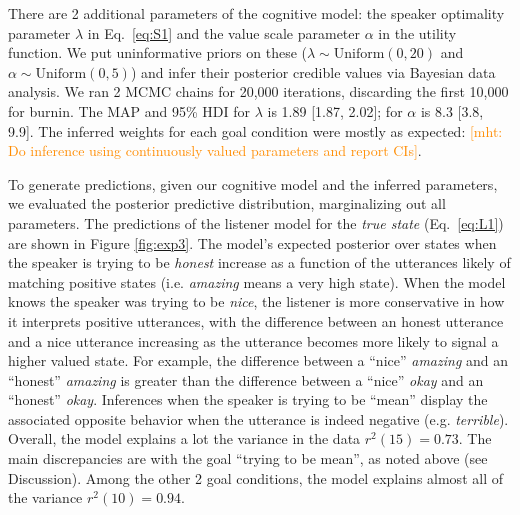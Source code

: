 \documentclass[10pt,letterpaper]{article}
\newcommand{\red}[1]{\textcolor{Red}{#1}}
\newcommand{\ndg}[1]{\textcolor{Green}{[ndg: #1]}}
\newcommand{\mht}[1]{\textcolor{DarkOrange}{[mht: #1]}}
\begin{document}
There are 2 additional parameters of the cognitive model: the speaker optimality parameter $\lambda$ in Eq.~\ref{eq:S1} and the value scale parameter $\alpha$ in the utility function. 
We put uninformative priors on these ($\lambda \sim \text{Uniform}(0,20)$ and $\alpha \sim \text{Uniform}(0, 5)$) and infer their posterior credible values via Bayesian data analysis.
We ran 2 MCMC chains for 20,000 iterations, discarding the first 10,000 for burnin.
The MAP and 95\% HDI for $\lambda$ is 1.89 [1.87, 2.02]; for $\alpha$ is 8.3 [3.8, 9.9]. %
The inferred weights for each goal condition were mostly as expected: 
\mht{Do inference using continuously valued parameters and report CIs}.
%

To generate predictions, given our cognitive model and the inferred parameters, we evaluated the posterior predictive distribution, marginalizing out all parameters. 
The predictions of the listener model for the \emph{true state} (Eq.~\ref{eq:L1}) are shown in Figure \ref{fig:exp3}.
The model's expected posterior over states when the speaker is trying to be \emph{honest} increase as a function of the utterances likely of matching positive states (i.e. \emph{amazing} means a very high state).
When the model knows the speaker was trying to be \emph{nice}, the listener is more conservative in how it interprets positive utterances, with the difference between an honest utterance and a nice utterance increasing as the utterance becomes more likely to signal a higher valued state. 
For example, the difference between a ``nice'' \emph{amazing} and an ``honest'' \emph{amazing} is greater than the difference between a ``nice'' \emph{okay} and an ``honest'' \emph{okay}.
Inferences when the speaker is trying to be ``mean'' display the associated opposite behavior when the utterance is indeed negative (e.g. \emph{terrible}).
Overall, the model explains a lot the variance in the data $r^2(15) = 0.73$. 
The main discrepancies are with the goal ``trying to be mean'', as noted above (see Discussion). 
Among the other 2 goal conditions, the model explains almost all of the variance $r^2(10) = 0.94$. 
\end{document}
